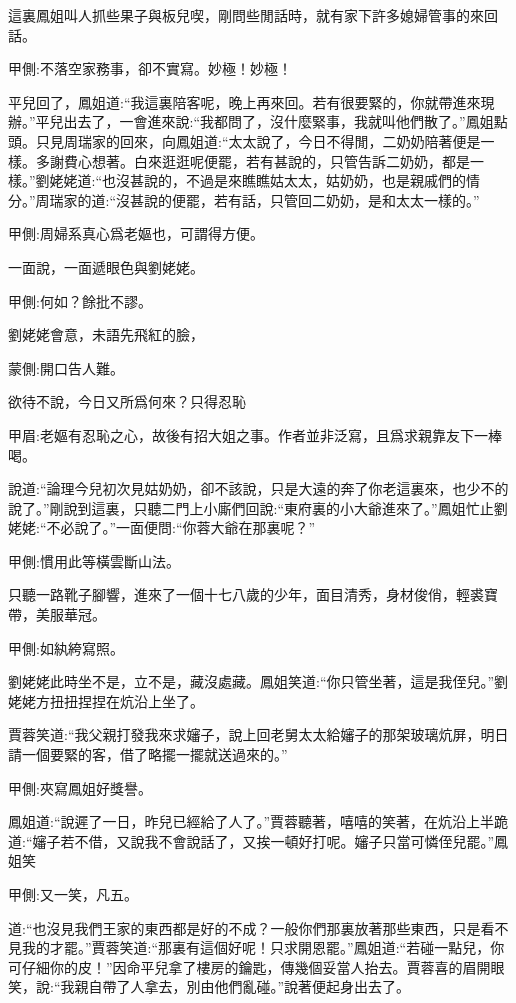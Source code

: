 \begin{parag}
    這裏鳳姐叫人抓些果子與板兒喫，剛問些閒話時，就有家下許多媳婦管事的來回話。\begin{note}甲側:不落空家務事，卻不實寫。妙極！妙極！\end{note}平兒回了，鳳姐道:“我這裏陪客呢，晚上再來回。若有很要緊的，你就帶進來現辦。”平兒出去了，一會進來說:“我都問了，沒什麼緊事，我就叫他們散了。”鳳姐點頭。只見周瑞家的回來，向鳳姐道:“太太說了，今日不得閒，二奶奶陪著便是一樣。多謝費心想著。白來逛逛呢便罷，若有甚說的，只管告訴二奶奶，都是一樣。”劉姥姥道:“也沒甚說的，不過是來瞧瞧姑太太，姑奶奶，也是親戚們的情分。”周瑞家的道:“沒甚說的便罷，若有話，只管回二奶奶，是和太太一樣的。”\begin{note}甲側:周婦系真心爲老嫗也，可謂得方便。\end{note}一面說，一面遞眼色與劉姥姥。\begin{note}甲側:何如？餘批不謬。\end{note}劉姥姥會意，未語先飛紅的臉，\begin{note}蒙側:開口告人難。\end{note}欲待不說，今日又所爲何來？只得忍恥\begin{note}甲眉:老嫗有忍恥之心，故後有招大姐之事。作者並非泛寫，且爲求親靠友下一棒喝。\end{note}說道:“論理今兒初次見姑奶奶，卻不該說，只是大遠的奔了你老這裏來，也少不的說了。”剛說到這裏，只聽二門上小廝們回說:“東府裏的小大爺進來了。”鳳姐忙止劉姥姥:“不必說了。”一面便問:“你蓉大爺在那裏呢？”\begin{note}甲側:慣用此等橫雲斷山法。\end{note}只聽一路靴子腳響，進來了一個十七八歲的少年，面目清秀，身材俊俏，輕裘寶帶，美服華冠。\begin{note}甲側:如紈絝寫照。\end{note}劉姥姥此時坐不是，立不是，藏沒處藏。鳳姐笑道:“你只管坐著，這是我侄兒。”劉姥姥方扭扭捏捏在炕沿上坐了。
\end{parag}


\begin{parag}
    賈蓉笑道:“我父親打發我來求嬸子，說上回老舅太太給嬸子的那架玻璃炕屏，明日請一個要緊的客，借了略擺一擺就送過來的。”\begin{note}甲側:夾寫鳳姐好獎譽。\end{note}鳳姐道:“說遲了一日，昨兒已經給了人了。”賈蓉聽著，嘻嘻的笑著，在炕沿上半跪道:“嬸子若不借，又說我不會說話了，又挨一頓好打呢。嬸子只當可憐侄兒罷。”鳳姐笑\begin{note}甲側:又一笑，凡五。\end{note}道:“也沒見我們王家的東西都是好的不成？一般你們那裏放著那些東西，只是看不見我的才罷。”賈蓉笑道:“那裏有這個好呢！只求開恩罷。”鳳姐道:“若碰一點兒，你可仔細你的皮！”因命平兒拿了樓房的鑰匙，傳幾個妥當人抬去。賈蓉喜的眉開眼笑，說:“我親自帶了人拿去，別由他們亂碰。”說著便起身出去了。
\end{parag}



